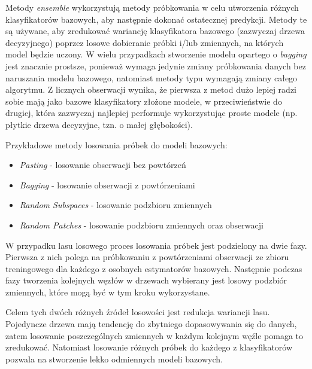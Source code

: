 \documentclass{book}
\begin{document}
	Metody \textit{ensemble} wykorzystują metody próbkowania w celu utworzenia różnych klasyfikatorów bazowych, aby następnie dokonać ostatecznej predykcji. Metody te są używane, aby zredukować wariancję klasyfikatora bazowego (zazwyczaj drzewa decyzyjnego) poprzez losowe dobieranie próbki i/lub zmiennych, na których model będzie uczony. W wielu przypadkach stworzenie modelu opartego o \textit{bagging} jest znacznie prostsze, ponieważ wymaga jedynie zmiany próbkowania danych bez naruszania modelu bazowego, natomiast metody typu  wymagają zmiany całego algorytmu. Z licznych obserwacji wynika, że pierwsza z metod dużo lepiej radzi sobie mają jako bazowe klasyfikatory złożone modele, w przeciwieństwie do drugiej, która zazwyczaj najlepiej performuje wykorzystując proste modele (np. płytkie drzewa decyzyjne, tzn. o małej głębokości).
	
	
	Przykładowe metody losowania próbek do modeli bazowych:
	\begin{itemize}
		\item \textit{Pasting} - losowanie obserwacji bez powtórzeń
		\item \textit{Bagging} - losowanie obserwacji z powtórzeniami
		\item \textit{Random Subspaces} - losowanie podzbioru zmiennych
		\item \textit{Random Patches} - losowanie podzbioru zmiennych oraz obserwacji 
	\end{itemize}
	
	
	W przypadku lasu losowego proces losowania próbek jest podzielony na dwie fazy. Pierwsza z nich polega na próbkowaniu z powtórzeniami obserwacji ze zbioru treningowego dla każdego z osobnych estymatorów bazowych. Następnie podczas fazy tworzenia kolejnych węzłów w drzewach wybierany jest losowy podzbiór zmiennych, które mogą być w tym kroku wykorzystane. 
	
	Celem tych dwóch różnych źródeł losowości jest redukcja wariancji lasu. Pojedyncze drzewa mają tendencję do zbytniego dopasowywania się do danych, zatem losowanie poszczególnych zmiennych w każdym kolejnym węźle pomaga to zredukować. Natomiast losowanie różnych próbek do każdego z klasyfikatorów pozwala na stworzenie lekko odmiennych modeli bazowych.
\end{document}
